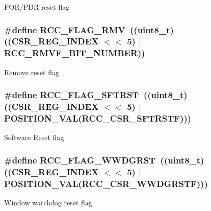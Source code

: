 P\-O\-R/\-P\-D\-R reset flag \hypertarget{group___r_c_c___flag_ga7f8c4619a9f4ca5d19340d0510aa37e5}{
\subsubsection[{R\-C\-C\-\_\-\-F\-L\-A\-G\-\_\-\-R\-M\-V}]{\setlength{\rightskip}{0pt plus 5cm}\#define R\-C\-C\-\_\-\-F\-L\-A\-G\-\_\-\-R\-M\-V~((uint8\-\_\-t)((C\-S\-R\-\_\-\-R\-E\-G\-\_\-\-I\-N\-D\-E\-X $<$$<$ 5) $\vert$ R\-C\-C\-\_\-\-R\-M\-V\-F\-\_\-\-B\-I\-T\-\_\-\-N\-U\-M\-B\-E\-R))}}\label{group___r_c_c___flag_ga7f8c4619a9f4ca5d19340d0510aa37e5}
Remove reset flag \hypertarget{group___r_c_c___flag_gaf7852615e9b19f0b2dbc8d08c7594b52}{
\subsubsection[{R\-C\-C\-\_\-\-F\-L\-A\-G\-\_\-\-S\-F\-T\-R\-S\-T}]{\setlength{\rightskip}{0pt plus 5cm}\#define R\-C\-C\-\_\-\-F\-L\-A\-G\-\_\-\-S\-F\-T\-R\-S\-T~((uint8\-\_\-t)((C\-S\-R\-\_\-\-R\-E\-G\-\_\-\-I\-N\-D\-E\-X $<$$<$ 5) $\vert$ P\-O\-S\-I\-T\-I\-O\-N\-\_\-\-V\-A\-L({\bf R\-C\-C\-\_\-\-C\-S\-R\-\_\-\-S\-F\-T\-R\-S\-T\-F})))}}\label{group___r_c_c___flag_gaf7852615e9b19f0b2dbc8d08c7594b52}
Software Reset flag \hypertarget{group___r_c_c___flag_gaa80b60b2d497ccd7b7de1075009999a7}{
\subsubsection[{R\-C\-C\-\_\-\-F\-L\-A\-G\-\_\-\-W\-W\-D\-G\-R\-S\-T}]{\setlength{\rightskip}{0pt plus 5cm}\#define R\-C\-C\-\_\-\-F\-L\-A\-G\-\_\-\-W\-W\-D\-G\-R\-S\-T~((uint8\-\_\-t)((C\-S\-R\-\_\-\-R\-E\-G\-\_\-\-I\-N\-D\-E\-X $<$$<$ 5) $\vert$ P\-O\-S\-I\-T\-I\-O\-N\-\_\-\-V\-A\-L({\bf R\-C\-C\-\_\-\-C\-S\-R\-\_\-\-W\-W\-D\-G\-R\-S\-T\-F})))}}\label{group___r_c_c___flag_gaa80b60b2d497ccd7b7de1075009999a7}
Window watchdog reset flag 
